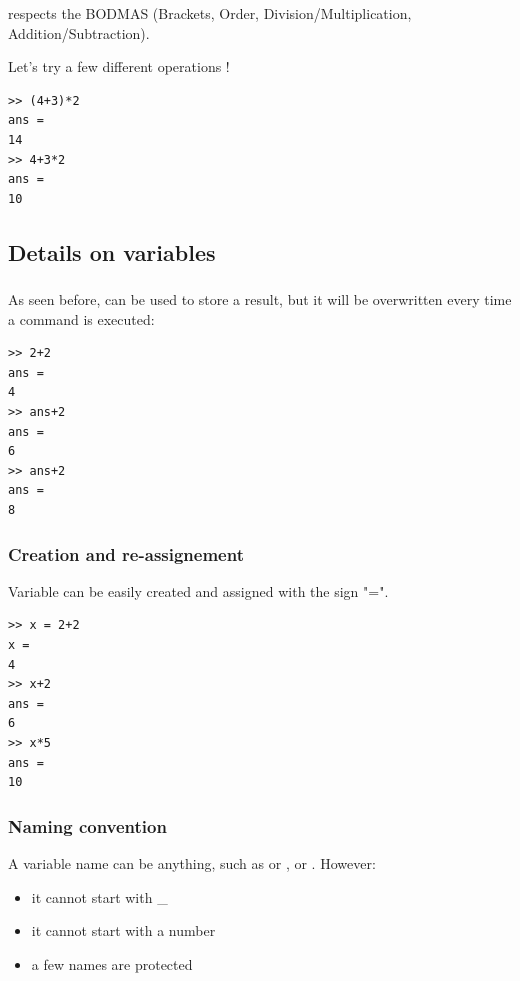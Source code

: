 		\matlab respects the BODMAS (Brackets, Order, Division/Multiplication, Addition/Subtraction). 

		Let's try a few different operations !
\begin{lstlisting}
>> (4+3)*2
ans =
14
>> 4+3*2
ans =
10
\end{lstlisting}

	\subsection{Details on variables}
		\subsubsection{}
			As seen before,  can be used to store a result, but it will be overwritten every time a command is executed:
\begin{lstlisting}
>> 2+2
ans =
4
>> ans+2
ans =
6
>> ans+2
ans =
8
\end{lstlisting}

		\subsubsection{Creation and re-assignement}
			Variable can be easily created and assigned with the sign "=". 
\begin{lstlisting}
>> x = 2+2
x =
4
>> x+2
ans =
6
>> x*5
ans =
10
\end{lstlisting}

		\subsubsection{Naming convention}
			A variable name can be anything, such as  or  , or  .
			However:
			\begin{itemize}
				\item it cannot start with \_
				\item it cannot start with a number
				\item a few names are protected
			\end{itemize}

